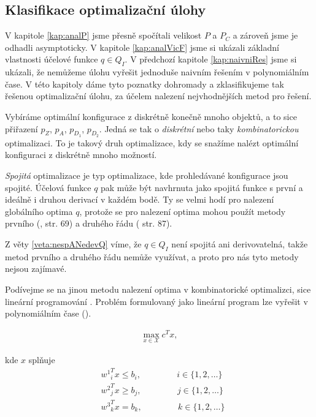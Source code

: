 \subsection{Klasifikace optimalizační úlohy}

V kapitole \ref{kap:analP} jsme přesně spočítali velikost $P$ a $P_C$ a zároveň jsme je odhadli asymptoticky.
V kapitole \ref{kap:analVicF} jsme si ukázali základní vlastnosti účelové funkce $q \in Q_I$.
V předchozí kapitole \ref{kap:naivniRes} jsme si ukázali, že nemůžeme úlohu vyřešit jednoduše naivním řešením v polynomiálním čase.
V této kapitoly dáme tyto poznatky dohromady a zklasifikujeme tak řešenou optimalizační úlohu, za účelem nalezení nejvhodnějších metod pro řešení.

Vybíráme optimální konfigurace z diskrétně konečně mnoho objektů, a to sice přiřazení $p_Z$, $p_A$, $p_{D_{1}}$, $p_{D_{2}}$.
Jedná se tak o \textit{diskrétní} nebo taky \textit{kombinatorickou} optimalizaci.
To je takový druh optimalizace, kdy se snažíme nalézt optimální konfiguraci z diskrétně mnoho možností.

\textit{Spojitá} optimalizace je typ optimalizace, kde prohledávané konfigurace jsou spojité.
Účelová funkce $q$ pak může být navhrnuta jako spojitá funkce s první a ideálně i druhou derivací v každém bodě.
Ty se velmi hodí pro nalezení globálního optima $q$, protože se pro nalezení optima mohou použít metody prvního (\citet{AlgOptBook}, str. 69) a druhého řádu (\citet{AlgOptBook} str. 87).

Z věty \ref{veta:nespANedevQ} víme, že $q \in Q_I$ není spojitá ani derivovatelná, takže metod prvního a druhého řádu nemůže využívat, a proto pro nás tyto metody nejsou zajímavé.

Podívejme se na jinou metodu nalezení optima v kombinatorické optimalizci, sice lineární programování \cite{LP}.
Problém formulovaný jako lineární program lze vyřešit v polynomiálním čase (\citet{cohen2020solving}).

\begin{definice}
  \begin{align*}
    \max_{x \in \mathcal{X}} c^T x,
  \end{align*}

  kde $x$ splňuje
  \begin{align*}
    &{w^1}^T_i x \leq b_i, \hspace{50pt} i \in \{ 1, 2, \dots \} \\
    &{w^2}^T_j x \geq b_j, \hspace{50pt} j \in \{ 1, 2, \dots \} \\
    &{w^3}^T_k x = b_k,    \hspace{50pt} k \in \{ 1, 2, \dots \}
  \end{align*}
\end{definice}

